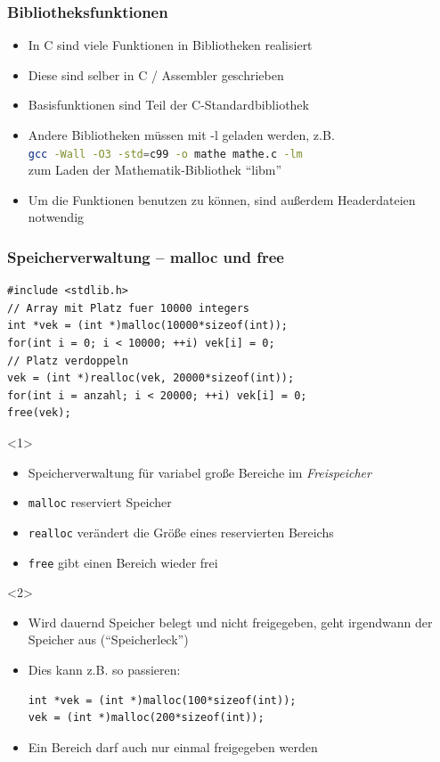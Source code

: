 \documentclass{slides}
\begin{document}
\begin{frame}[fragile]
  \frametitle{Bibliotheksfunktionen}

  \begin{itemize}
  \item In C sind viele Funktionen in Bibliotheken realisiert
  \item Diese sind selber in C / Assembler geschrieben
  \item Basisfunktionen sind Teil der C-Standardbibliothek
  \item Andere Bibliotheken müssen mit -l geladen werden, z.B.\\
    \lstinline[language=bash]!gcc -Wall -O3 -std=c99 -o mathe mathe.c -lm!\\
    zum Laden der Mathematik-Bibliothek "`libm"'
  \item Um die Funktionen benutzen zu können, sind außerdem Headerdateien notwendig
  \end{itemize}
\end{frame}

\begin{frame}[fragile]
  \frametitle{Speicherverwaltung -- malloc und free}

\begin{lstlisting}[emph={malloc,realloc,free}]
#include <stdlib.h>
// Array mit Platz fuer 10000 integers
int *vek = (int *)malloc(10000*sizeof(int));
for(int i = 0; i < 10000; ++i) vek[i] = 0;
// Platz verdoppeln
vek = (int *)realloc(vek, 20000*sizeof(int));
for(int i = anzahl; i < 20000; ++i) vek[i] = 0;
free(vek);
\end{lstlisting}

  \begin{onlyenv}<1>
    \begin{itemize}
    \item Speicherverwaltung für variabel große Bereiche im \emph{Freispeicher}
    \item \lstinline!malloc! reserviert Speicher
    \item \lstinline!realloc! verändert die Größe eines reservierten Bereichs
    \item \lstinline!free! gibt einen Bereich wieder frei
    \end{itemize}
  \end{onlyenv}
  \begin{onlyenv}<2>
    \begin{itemize}
    \item Wird dauernd Speicher belegt und nicht freigegeben, geht irgendwann der Speicher aus
      ("`Speicherleck"')
    \item Dies kann z.B. so passieren:

\begin{lstlisting}[belowskip=0.25em]
int *vek = (int *)malloc(100*sizeof(int));
vek = (int *)malloc(200*sizeof(int));
\end{lstlisting}

    \item Ein Bereich darf auch nur einmal freigegeben werden
    \end{itemize}
  \end{onlyenv}
\end{frame}
\end{document}
